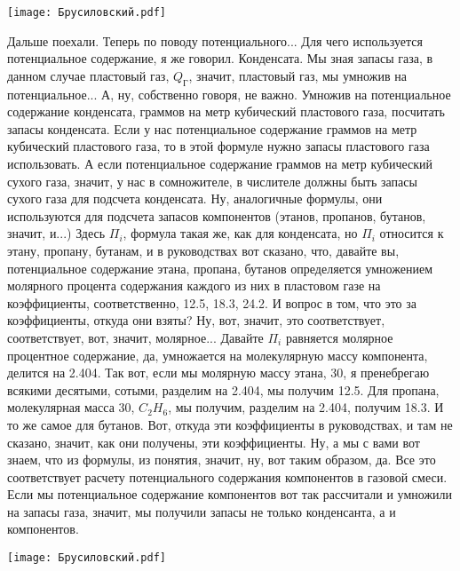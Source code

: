 \documentclass[main.tex]{subfiles}
\begin{document}
\begin{center}
\texttt{[image: Брусиловский.pdf]}
\end{center}

Дальше поехали.
Теперь по поводу потенциального...
Для чего используется потенциальное содержание, я же говорил.
Конденсата.
Мы зная запасы газа, в данном случае пластовый газ, $Q_{\text{Г}}$, значит, пластовый газ, мы умножив на потенциальное...
А, ну, собственно говоря, не важно.
Умножив на потенциальное содержание конденсата, граммов на метр кубический пластового газа, посчитать запасы конденсата.
Если у нас потенциальное содержание граммов на метр кубический пластового газа, то в этой формуле нужно запасы пластового газа использовать.
А если потенциальное содержание граммов на метр кубический сухого газа, значит, у нас в сомножителе, в числителе должны быть запасы сухого газа для подсчета конденсата.
Ну, аналогичные формулы, они используются для подсчета запасов компонентов (этанов, пропанов, бутанов, значит, и...)
Здесь $\Pi_i$, формула такая же, как для конденсата, но $\Pi_i$ относится к этану, пропану, бутанам, и в руководствах вот сказано, что, давайте вы, потенциальное содержание этана, пропана, бутанов определяется умножением молярного процента содержания каждого из них в пластовом газе на коэффициенты, соответственно, 12.5, 18.3, 24.2.
И вопрос в том, что это за коэффициенты, откуда они взяты?
Ну, вот, значит, это соответствует, соответствует, вот, значит, молярное...
Давайте $\Pi_i$ равняется молярное процентное содержание, да, умножается на молекулярную массу компонента, делится на 2.404.
Так вот, если мы молярную массу этана, 30, я пренебрегаю всякими десятыми, сотыми, разделим на 2.404, мы получим 12.5.
Для пропана, молекулярная масса 30, $C_2H_6$, мы получим, разделим на 2.404, получим 18.3.
И то же самое для бутанов.
Вот, откуда эти коэффициенты в руководствах, и там не сказано, значит, как они получены, эти коэффициенты.
Ну, а мы с вами вот знаем, что из формулы, из понятия, значит, ну, вот таким образом, да.
Все это соответствует расчету потенциального содержания компонентов в газовой смеси.
Если мы потенциальное содержание компонентов вот так рассчитали и умножили на запасы газа, значит, мы получили запасы не только конденсанта, а и компонентов.

\begin{center}
\texttt{[image: Брусиловский.pdf]}
\end{center}
\end{document}
